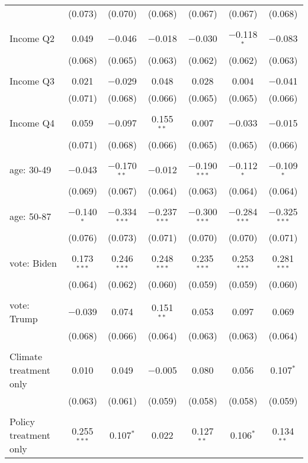 \begin{tabular}{@{\extracolsep{5pt}}lcccccc}
  & (0.073) & (0.070) & (0.068) & (0.067) & (0.067) & (0.068) \\ 
  & & & & & & \\ 
 Income Q2 & 0.049 & $-$0.046 & $-$0.018 & $-$0.030 & $-$0.118$^{*}$ & $-$0.083 \\ 
  & (0.068) & (0.065) & (0.063) & (0.062) & (0.062) & (0.063) \\ 
  & & & & & & \\ 
 Income Q3 & 0.021 & $-$0.029 & 0.048 & 0.028 & 0.004 & $-$0.041 \\ 
  & (0.071) & (0.068) & (0.066) & (0.065) & (0.065) & (0.066) \\ 
  & & & & & & \\ 
 Income Q4 & 0.059 & $-$0.097 & 0.155$^{**}$ & 0.007 & $-$0.033 & $-$0.015 \\ 
  & (0.071) & (0.068) & (0.066) & (0.065) & (0.065) & (0.066) \\ 
  & & & & & & \\ 
 age: 30-49 & $-$0.043 & $-$0.170$^{**}$ & $-$0.012 & $-$0.190$^{***}$ & $-$0.112$^{*}$ & $-$0.109$^{*}$ \\ 
  & (0.069) & (0.067) & (0.064) & (0.063) & (0.064) & (0.064) \\ 
  & & & & & & \\ 
 age: 50-87 & $-$0.140$^{*}$ & $-$0.334$^{***}$ & $-$0.237$^{***}$ & $-$0.300$^{***}$ & $-$0.284$^{***}$ & $-$0.325$^{***}$ \\ 
  & (0.076) & (0.073) & (0.071) & (0.070) & (0.070) & (0.071) \\ 
  & & & & & & \\ 
 vote: Biden & 0.173$^{***}$ & 0.246$^{***}$ & 0.248$^{***}$ & 0.235$^{***}$ & 0.253$^{***}$ & 0.281$^{***}$ \\ 
  & (0.064) & (0.062) & (0.060) & (0.059) & (0.059) & (0.060) \\ 
  & & & & & & \\ 
 vote: Trump & $-$0.039 & 0.074 & 0.151$^{**}$ & 0.053 & 0.097 & 0.069 \\ 
  & (0.068) & (0.066) & (0.064) & (0.063) & (0.063) & (0.064) \\ 
  & & & & & & \\ 
 Climate treatment only & 0.010 & 0.049 & $-$0.005 & 0.080 & 0.056 & 0.107$^{*}$ \\ 
  & (0.063) & (0.061) & (0.059) & (0.058) & (0.058) & (0.059) \\ 
  & & & & & & \\ 
 Policy treatment only & 0.255$^{***}$ & 0.107$^{*}$ & 0.022 & 0.127$^{**}$ & 0.106$^{*}$ & 0.134$^{**}$ \\ 

\end{tabular}
